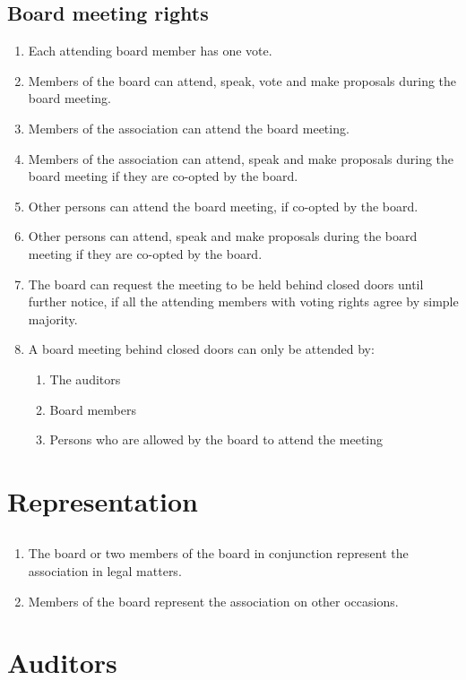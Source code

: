 \subsection{Board meeting rights}
\begin{enumerate}
  \item Each attending board member has one vote.
  \item Members of the board can attend, speak, vote and make proposals during the board meeting.
  \item Members of the association can attend the board meeting.
  \item Members of the association can attend, speak and make proposals during the board meeting if they are co-opted by the board.
  \item Other persons can attend the board meeting, if co-opted by the board.
  \item Other persons can attend, speak and make proposals during the board meeting if they are co-opted by the board.
  \item The board can request the meeting to be held behind closed doors until further notice, if all the attending members with voting rights agree by simple majority.
  \item A board meeting behind closed doors can only be attended by: 
  \begin{enumerate}
    \item The auditors 
    \item Board members 
    \item Persons who are allowed by the board to attend the meeting
  \end{enumerate}
\end{enumerate}

\section*{Representation}
\subsection{}
\begin{enumerate}
  \item The board or two members of the board in conjunction represent the association in legal matters.
  \item Members of the board represent the association on other occasions.
\end{enumerate}

\section*{Auditors }
